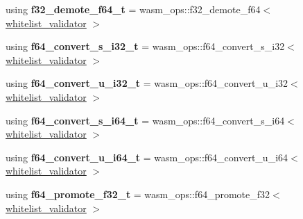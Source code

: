 \begin{DoxyCompactItemize}
using {\bfseries f32\+\_\+demote\+\_\+f64\+\_\+t} = wasm\+\_\+ops\+::f32\+\_\+demote\+\_\+f64$<$ \mbox{\hyperlink{structaacio_1_1chain_1_1wasm__validations_1_1whitelist__validator}{whitelist\+\_\+validator}} $>$
\item 
\mbox{\label{structaacio_1_1chain_1_1wasm__validations_1_1op__constrainers_ab12519e187b534c4e49e4712b7f351e0}} 
using {\bfseries f64\+\_\+convert\+\_\+s\+\_\+i32\+\_\+t} = wasm\+\_\+ops\+::f64\+\_\+convert\+\_\+s\+\_\+i32$<$ \mbox{\hyperlink{structaacio_1_1chain_1_1wasm__validations_1_1whitelist__validator}{whitelist\+\_\+validator}} $>$
\item 
\mbox{\label{structaacio_1_1chain_1_1wasm__validations_1_1op__constrainers_a0e2df291e56f9b740220d4a0948487f0}} 
using {\bfseries f64\+\_\+convert\+\_\+u\+\_\+i32\+\_\+t} = wasm\+\_\+ops\+::f64\+\_\+convert\+\_\+u\+\_\+i32$<$ \mbox{\hyperlink{structaacio_1_1chain_1_1wasm__validations_1_1whitelist__validator}{whitelist\+\_\+validator}} $>$
\item 
\mbox{\label{structaacio_1_1chain_1_1wasm__validations_1_1op__constrainers_a964a7ae5926a461895ba2dcebf952fbd}} 
using {\bfseries f64\+\_\+convert\+\_\+s\+\_\+i64\+\_\+t} = wasm\+\_\+ops\+::f64\+\_\+convert\+\_\+s\+\_\+i64$<$ \mbox{\hyperlink{structaacio_1_1chain_1_1wasm__validations_1_1whitelist__validator}{whitelist\+\_\+validator}} $>$
\item 
\mbox{\label{structaacio_1_1chain_1_1wasm__validations_1_1op__constrainers_abf1c98334b8743978288cf893ab465af}} 
using {\bfseries f64\+\_\+convert\+\_\+u\+\_\+i64\+\_\+t} = wasm\+\_\+ops\+::f64\+\_\+convert\+\_\+u\+\_\+i64$<$ \mbox{\hyperlink{structaacio_1_1chain_1_1wasm__validations_1_1whitelist__validator}{whitelist\+\_\+validator}} $>$
\item 
\mbox{\label{structaacio_1_1chain_1_1wasm__validations_1_1op__constrainers_ae88e0f92329357c6b47fb5865e048177}} 
using {\bfseries f64\+\_\+promote\+\_\+f32\+\_\+t} = wasm\+\_\+ops\+::f64\+\_\+promote\+\_\+f32$<$ \mbox{\hyperlink{structaacio_1_1chain_1_1wasm__validations_1_1whitelist__validator}{whitelist\+\_\+validator}} $>$

\end{DoxyCompactItemize}
